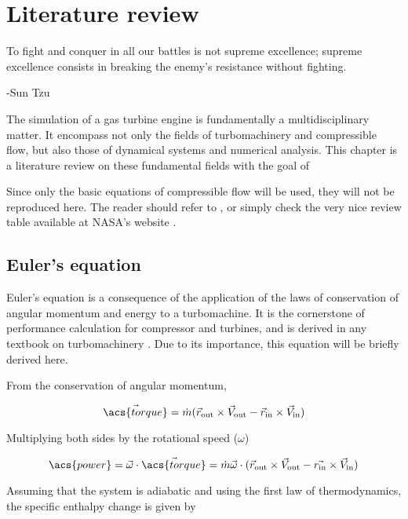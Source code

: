 \documentclass[tcc]{subfiles}
\begin{document}
\chapter{Literature review}
\label{sec:review}
\epigraph{To fight and conquer in all our battles is not supreme excellence; supreme excellence consists in breaking the enemy's resistance without fighting.}{-Sun Tzu}

The simulation of a gas turbine engine is fundamentally a multidisciplinary matter.
It encompass not only the fields of turbomachinery and compressible flow, 
but also those of dynamical systems and numerical analysis.
This chapter is a literature review on these fundamental fields with the goal of 

Since only the basic equations of compressible flow will be used, they will not be reproduced here. 
The reader should refer to \textcite{Anderson, Shapiro}, 
or simply check the very nice review table available at NASA's website \cite{nasa_isentropic}.

\section{Euler's equation}
\label{sec:euler_equation}
Euler's equation is a consequence of the application of the laws of conservation of angular momentum and energy to a turbomachine. It is the cornerstone of performance calculation for compressor and turbines, and is derived in any textbook on turbomachinery \cite{Lakshminarayana1996, Dixon1998, Schobeiri2004, Hill1991, Logan2003, Baskharone2006}. Due to its importance, this equation will be briefly derived here.

From the conservation of angular momentum, 

\begin{equation}
    \vec{\acs{torque}} = \dot{m} (\vec{r}_{\text{out}}\cross\vec{V}_{\text{out}} - \vec{r}_{\text{in}}\cross\vec{V}_{\text{in}}) 
\end{equation}

Multiplying both sides by the rotational speed ($\omega$)

\begin{equation}
    \acs{power} = \vec{\omega}\cdot\vec{\acs{torque}} 
                = \dot{m} \vec{\omega} \cdot (\vec{r}_{\text{out}}\cross\vec{V}_{\text{out}} - \vec{r_{\text{in}}}\cross\vec{V}_{\text{in}}) 
\end{equation}

Assuming that the system is adiabatic and using the first law of thermodynamics, the specific enthalpy change is given by
\end{document}
